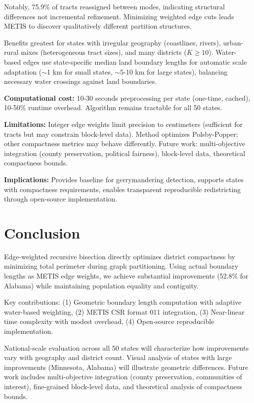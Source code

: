 \documentclass[11pt,twocolumn]{article}
\begin{document}
Notably, 75.9\% of tracts reassigned between modes, indicating structural differences not incremental refinement. Minimizing weighted edge cuts leads METIS to discover qualitatively different partition structures.

Benefits greatest for states with irregular geography (coastlines, rivers), urban-rural mixes (heterogeneous tract sizes), and many districts ($K \geq 10$). Water-based edges use state-specific median land boundary lengths for automatic scale adaptation ($\sim$1 km for small states, $\sim$5-10 km for large states), balancing necessary water crossings against land boundaries.

\textbf{Computational cost:} 10-30 seconds preprocessing per state (one-time, cached), 10-50\% runtime overhead. Algorithm remains tractable for all 50 states.

\textbf{Limitations:} Integer edge weights limit precision to centimeters (sufficient for tracts but may constrain block-level data). Method optimizes Polsby-Popper; other compactness metrics may behave differently. Future work: multi-objective integration (county preservation, political fairness), block-level data, theoretical compactness bounds.

\textbf{Implications:} Provides baseline for gerrymandering detection, supports states with compactness requirements, enables transparent reproducible redistricting through open-source implementation.

\section{Conclusion}

Edge-weighted recursive bisection directly optimizes district compactness by minimizing total perimeter during graph partitioning. Using actual boundary lengths as METIS edge weights, we achieve substantial improvements (52.8\% for Alabama) while maintaining population equality and contiguity.

Key contributions: (1) Geometric boundary length computation with adaptive water-based weighting, (2) METIS CSR format 011 integration, (3) Near-linear time complexity with modest overhead, (4) Open-source reproducible implementation.

National-scale evaluation across all 50 states will characterize how improvements vary with geography and district count. Visual analysis of states with large improvements (Minnesota, Alabama) will illustrate geometric differences. Future work includes multi-objective integration (county preservation, communities of interest), fine-grained block-level data, and theoretical analysis of compactness bounds.
\end{document}

